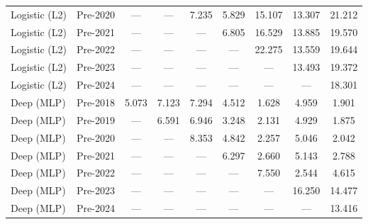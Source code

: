 \begin{table}[htbp]
{\begin{tabular}{l lccccccc}
Logistic (L2) & Pre-2020 & --- & --- & 7.235 & 5.829 & 15.107 & 13.307 & 21.212 \\
Logistic (L2) & Pre-2021 & --- & --- & --- & 6.805 & 16.529 & 13.885 & 19.570 \\
Logistic (L2) & Pre-2022 & --- & --- & --- & --- & 22.275 & 13.559 & 19.644 \\
Logistic (L2) & Pre-2023 & --- & --- & --- & --- & --- & 13.493 & 19.372 \\
Logistic (L2) & Pre-2024 & --- & --- & --- & --- & --- & --- & 18.301 \\
Deep (MLP) & Pre-2018 & 5.073 & 7.123 & 7.294 & 4.512 & 1.628 & 4.959 & 1.901 \\
Deep (MLP) & Pre-2019 & --- & 6.591 & 6.946 & 3.248 & 2.131 & 4.929 & 1.875 \\
Deep (MLP) & Pre-2020 & --- & --- & 8.353 & 4.842 & 2.257 & 5.046 & 2.042 \\
Deep (MLP) & Pre-2021 & --- & --- & --- & 6.297 & 2.660 & 5.143 & 2.788 \\
Deep (MLP) & Pre-2022 & --- & --- & --- & --- & 7.550 & 2.544 & 4.615 \\
Deep (MLP) & Pre-2023 & --- & --- & --- & --- & --- & 16.250 & 14.477 \\
Deep (MLP) & Pre-2024 & --- & --- & --- & --- & --- & --- & 13.416 \\
\bottomrule
\end{tabular}%
}
\end{table}